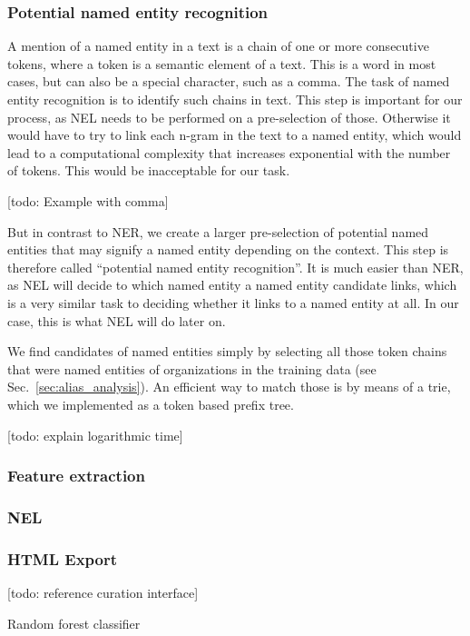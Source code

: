 \subsubsection{Potential named entity recognition}
A mention of a named entity in a text is a chain of one or more consecutive tokens, where a token is a semantic element of a text. This is a word in most cases, but can also be a special character, such as a comma. The task of named entity recognition is to identify such chains in text. This step is important for our process, as NEL needs to be performed on a pre-selection of those. Otherwise it would have to try to link each n-gram in the text to a named entity, which would lead to a computational complexity that increases exponential with the number of tokens. This would be inacceptable for our task.

[todo: Example with comma]

But in contrast to NER, we create a larger pre-selection of potential named entities that may signify a named entity depending on the context. This step is therefore called "`potential named entity recognition"'. It is much easier than NER, as NEL will decide to which named entity a named entity candidate links, which is a very similar task to deciding whether it links to a named entity at all. In our case, this is what NEL will do later on.

We find candidates of named entities simply by selecting all those token chains that were named entities of organizations in the training data (see Sec.~\ref{sec:alias_analysis}). An efficient way to match those is by means of a trie, which we implemented as a token based prefix tree.

[todo: explain logarithmic time]

\subsubsection{Feature extraction}
\subsubsection{NEL}
\subsubsection{HTML Export}
[todo: reference curation interface]

Random forest classifier\\
